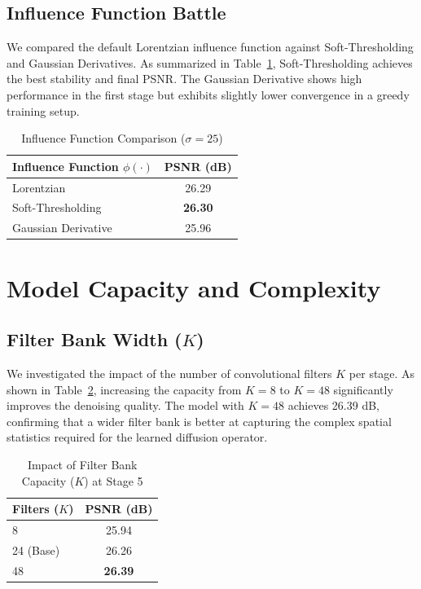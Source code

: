 \documentclass[11pt]{article}
\begin{document}
\subsection{Influence Function Battle}

We compared the default Lorentzian influence function against Soft-Thresholding and Gaussian Derivatives. As summarized in Table~\ref{tab:phi_ablation}, Soft-Thresholding achieves the best stability and final PSNR. The Gaussian Derivative shows high performance in the first stage but exhibits slightly lower convergence in a greedy training setup.

\begin{table}[h]
	\centering
	\caption{Influence Function Comparison ($\sigma=25$)}
	\label{tab:phi_ablation}
	\begin{tabular}{l c}
		\toprule
		Influence Function $\phi(\cdot)$ & PSNR (dB)      \\
		\midrule
		Lorentzian                      & 26.29          \\
		Soft-Thresholding               & \textbf{26.30} \\
		Gaussian Derivative             & 25.96          \\
		\bottomrule
	\end{tabular}
\end{table}

\section{Model Capacity and Complexity}

\subsection{Filter Bank Width ($K$)}

We investigated the impact of the number of convolutional filters $K$ per stage. As shown in Table~\ref{tab:capacity_ablation}, increasing the capacity from $K=8$ to $K=48$ significantly improves the denoising quality. The model with $K=48$ achieves 26.39 dB, confirming that a wider filter bank is better at capturing the complex spatial statistics required for the learned diffusion operator.

\begin{table}[h]
	\centering
	\caption{Impact of Filter Bank Capacity ($K$) at Stage 5}
	\label{tab:capacity_ablation}
	\begin{tabular}{l c}
		\toprule
		Filters ($K$) & PSNR (dB)      \\
		\midrule
		8             & 25.94          \\
		24 (Base)     & 26.26          \\
		48            & \textbf{26.39} \\
		\bottomrule
	\end{tabular}
\end{table}
\end{document}
